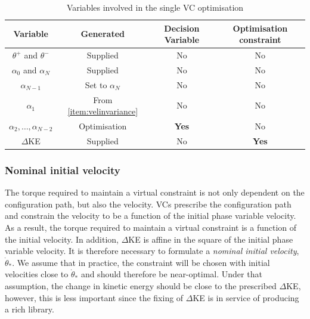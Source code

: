 \begin{table}
	\centering
	\begin{tabular}{c | c | c | c}
		            Variable             & Generated                     & Decision Variable & Optimisation constraint \\ \hline
		   $\theta^+$ and $\theta^-$     & Supplied                      & No                & No                      \\
		   $\alpha_0$ and $\alpha_N$     & Supplied                      & No                & No                      \\
		         $\alpha_{N-1}$          & Set to $\alpha_N$             & No                & No                      \\
		           $\alpha_1$            & From \ref{item:velinvariance} & No                & No                      \\
		$\alpha_2, \ldots, \alpha_{N-2}$ & Optimisation                  & \textbf{Yes}      & No                      \\
		           $\Delta$KE            & Supplied                      & No                & \textbf{Yes}            \\
	\end{tabular}
	\caption{Variables involved in the single VC optimisation}
	\label{tab:optDecVars}
\end{table}

\subsubsection{Nominal initial velocity}
The torque required to maintain a virtual constraint is not only dependent on the configuration path, but also the velocity. VCs prescribe the configuration path and constrain the velocity to be a function of the initial phase variable velocity. As a result, the torque required to maintain a virtual constraint is a function of the initial velocity. In addition, $\Delta$KE is affine in the square of the initial phase variable velocity. It is therefore necessary to formulate a \textit{nominal initial velocity}, $\dot{\theta}_*$. We assume that in practice, the constraint will be chosen with initial velocities close to $\dot{\theta}_*$ and should therefore be near-optimal. Under that assumption, the change in kinetic energy should be close to the prescribed $\Delta$KE, however, this is less important since the fixing of $\Delta$KE is in service of producing a rich library.

